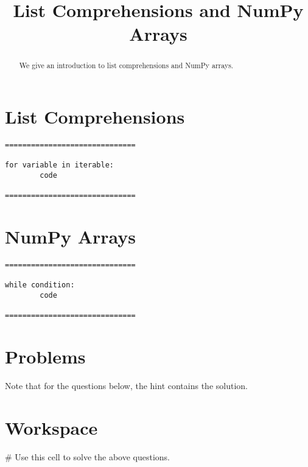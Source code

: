 \documentclass{ximera}
\title{List Comprehensions and NumPy Arrays}
\begin{document}
  
\begin{abstract}  
We give an introduction to list comprehensions and NumPy arrays.
\end{abstract}  
\maketitle

\section{List Comprehensions}



\begin{verbatim}
==============================

for variable in iterable:
        code

==============================
\end{verbatim}


\section{NumPy Arrays}


\begin{verbatim}
==============================

while condition:
        code

==============================
\end{verbatim}

\section{Problems}

Note that for the questions below, the hint contains the solution.

\begin{question}
\end{question}

\section{Workspace}

\begin{sageCell}
# Use this cell to solve the above questions.
\end{sageCell}
\end{document}
